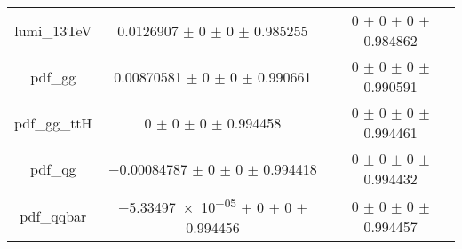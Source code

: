 \begin{table}
\begin{tabular}{ccc}
lumi\_13TeV & \num{0.0126907} $\pm$ \num{0} $\pm$ \num{0} $\pm$ \num{0.985255} & \num{0} $\pm$ \num{0} $\pm$ \num{0} $\pm$ \num{0.984862}\\
pdf\_gg & \num{0.00870581} $\pm$ \num{0} $\pm$ \num{0} $\pm$ \num{0.990661} & \num{0} $\pm$ \num{0} $\pm$ \num{0} $\pm$ \num{0.990591}\\
pdf\_gg\_ttH & \num{0} $\pm$ \num{0} $\pm$ \num{0} $\pm$ \num{0.994458} & \num{0} $\pm$ \num{0} $\pm$ \num{0} $\pm$ \num{0.994461}\\
pdf\_qg & \num{-0.00084787} $\pm$ \num{0} $\pm$ \num{0} $\pm$ \num{0.994418} & \num{0} $\pm$ \num{0} $\pm$ \num{0} $\pm$ \num{0.994432}\\
pdf\_qqbar & \num{-5.33497e-05} $\pm$ \num{0} $\pm$ \num{0} $\pm$ \num{0.994456} & \num{0} $\pm$ \num{0} $\pm$ \num{0} $\pm$ \num{0.994457}\\
\bottomrule
\end{tabular}
\end{table}
